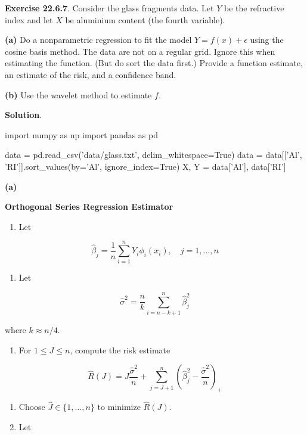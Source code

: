 \textbf{Exercise 22.6.7}. Consider the glass fragments data. Let \(Y\)
be the refractive index and let \(X\) be aluminium content (the fourth
variable).

\textbf{(a)} Do a nonparametric regression to fit the model
\(Y = f(x) + \epsilon\) using the cosine basis method. The data are not
on a regular grid. Ignore this when estimating the function. (But do
sort the data first.) Provide a function estimate, an estimate of the
risk, and a confidence band.

\textbf{(b)} Use the wavelet method to estimate \(f\).

\textbf{Solution}.

\begin{python}
import numpy as np
import pandas as pd

data = pd.read_csv('data/glass.txt', delim_whitespace=True)
data = data[['Al', 'RI']].sort_values(by='Al', ignore_index=True)
X, Y = data['Al'], data['RI']
\end{python}

\textbf{(a)}

\textbf{Orthogonal Series Regression Estimator}

\begin{enumerate}[tightlist,label={\arabic*.}]
\item
  Let
\end{enumerate}

\[ \hat{\beta}_j = \frac{1}{n} \sum_{i=1}^n Y_i \phi_i(x_i), \quad j = 1, \dots, n\]

\begin{enumerate}[tightlist,label={\arabic*.}]
\item
  Let
\end{enumerate}

\[ \hat{\sigma}^2 = \frac{n}{k} \sum_{i=n-k+1}^n \hat{\beta}_j^2 \]

where \(k \approx n / 4\).

\begin{enumerate}[tightlist,label={\arabic*.},resume]
\item
  For \(1 \leq J \leq n\), compute the risk estimate
\end{enumerate}

\[ \hat{R}(J) = J \frac{\hat{\sigma}^2}{n} + \sum_{j=J+1}^n \left(\hat{\beta}_j^2 - \frac{\hat{\sigma}^2}{n} \right)_{+} \]

\begin{enumerate}
\def\labelenumi{\arabic{enumi}.}
\setcounter{enumi}{3}
\item
  Choose \(\hat{J} \in \{1, \dots, n \}\) to minimize \(\hat{R}(J)\).
\item
  Let
\end{enumerate}

